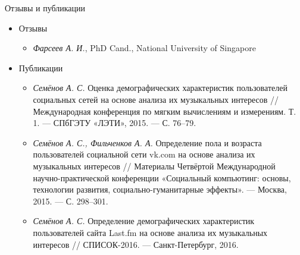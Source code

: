\documentclass{beamer}
\begin{document}
\begin{frame}{Отзывы и публикации}
    \begin{itemize}
        \item {Отзывы}
            \begin{itemize}
                \item {\textit{Фарсеев А. И.}, PhD Cand., National University of Singapore}
            \end{itemize}
        \item {Публикации}
            \begin{itemize}
                \item {\textit{Семёнов А. С.} Оценка демографических характеристик пользователей
                       социальных сетей на основе анализа их музыкальных
                       интересов // Международная конференция по мягким
                       вычислениям и измерениям. Т.
                       1. — СПбГЭТУ «ЛЭТИ», 2015. — С. 76–79.}
                \item {\textit{Семёнов А. С., Фильченков А. А.} Определение пола
                       и возраста пользователей социальной сети vk.com на основе
                       анализа их музыкальных интересов // Материалы Четвёртой
                       Международной научно-практической конференции «Социальный
                       компьютинг: основы, технологии развития, социально-гуманитарные
                       эффекты». — Москва, 2015. — С. 298–301.}
                \item {\textit{Семёнов А. С.} Определение демографических характеристик
                       пользователей сайта Last.fm на основе анализа их музыкальных
                       интересов // СПИСОК-2016. — Санкт-Петербург, 2016.}
            \end{itemize}
    \end{itemize}
\end{frame}

\begin{frame}
    \titlepage
\end{frame}
\end{document}
